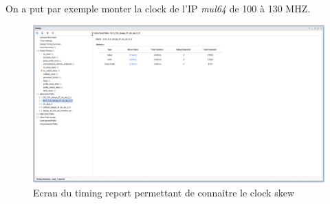 \documentclass[12pt,a4paper]{article}
\begin{document}
On a put par exemple monter la clock de l'IP \textit{mul64} de 100 à 130 MHZ.

\begin{figure}[H]
	\centering
		\includegraphics[width=\linewidth]{im/timing.png}	
	\caption{Ecran du timing report permettant de connaitre le clock skew}
	\label{fig-clk}
\end{figure}
\end{document}
